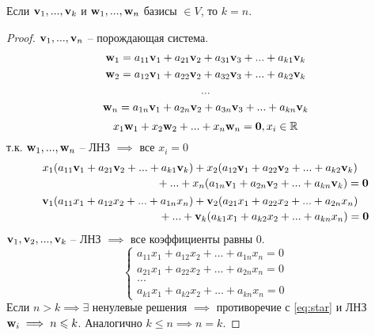 \documentclass[main]{subfiles}
\begin{document}
\begin{theorem}
    Если $\mathbf{v}_1, ..., \mathbf{v}_k$ и $\mathbf{w}_1, ...,\mathbf{w}_n$ базисы $\in V$, то $k=n$.
\end{theorem}
\begin{proof}
    $\mathbf{v}_1, ..., \mathbf{v}_n$ -- порождающая система.
    \begin{gather*}
        \mathbf{w}_1 = a_{11} \mathbf{v}_1 + a_{21} \mathbf{v}_2  + a_{31} \mathbf{v}_3 + ... + a_{k1} \mathbf{v}_k \\
        \mathbf{w}_2 = a_{12} \mathbf{v}_1 + a_{22} \mathbf{v}_2  + a_{32} \mathbf{v}_3 + ... + a_{k2} \mathbf{v}_k \\
        ...                                                            \\
        \mathbf{w}_n = a_{1n} \mathbf{v}_1 + a_{2n} \mathbf{v}_2  + a_{3n} \mathbf{v}_3 + ... + a_{kn} \mathbf{v}_k \\
    \end{gather*}
    \begin{equation}\label{eq:star}
        x_1 \mathbf{w}_1 + x_2 \mathbf{w}_2 + ... + x_n \mathbf{w}_n = \mathbf{0}, x_i \in \mathbb{R}
    \end{equation}
    т.к. $\mathbf{w}_1, ..., \mathbf{w}_n$ -- ЛНЗ $\implies$ все $x_i=0$
    \begin{gather*}
        \begin{multlined}
            x_1 (a_{11} \vv_1 + a_{21} \vv_2 + ... + a_{k1} \vv_k) +
            x_2 (a_{12} \vv_1 + a_{22} \vv_2 + ... + a_{k2} \vv_k) \\
            + ... +
            x_n (a_{1n} \vv_1 + a_{2n} \vv_2 + ... + a_{kn} \vv_k) = \zv
        \end{multlined}\\
        \begin{multlined}
            \vv_1 (a_{11} x_1 + a_{12} x_2 + ... + a_{1n} x_n ) +
            \vv_2 (a_{21} x_1 + a_{22} x_2 + ... + a_{2n} x_n ) \\
            + ... +
            \vv_k (a_{k1} x_1 + a_{k2} x_2 + ... + a_{kn} x_n ) = \zv
        \end{multlined}
    \end{gather*}
    $\mathbf{v}_1, \mathbf{v}_2, ..., \mathbf{v}_k$ -- ЛНЗ $\implies$ все коэффициенты равны 0.
    \[\begin{cases}
            a_{11} x_1 + a_{12} x_2 + ... + a_{1n}x_n = 0 \\
            a_{21} x_1 + a_{22} x_2 + ... + a_{2n}x_n = 0 \\
            ...                                           \\
            a_{k1} x_1 + a_{k2} x_2 + ... + a_{kn}x_n = 0
        \end{cases}\]
    Если $n>k \implies \exists$ ненулевые решения $\implies$ противоречие
    с \eqref{eq:star} и ЛНЗ $\mathbf{w}_i \implies n \leqslant k$. Аналогично $k \le n \implies n=k$.
\end{proof}
\end{document}
